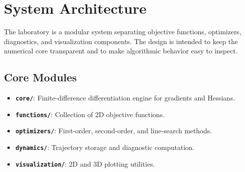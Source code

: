 \documentclass[12pt,a4paper]{report}
\begin{document}


\begin{abstract}
The Optimization Dynamics Laboratory is a Python framework for the empirical study of numerical optimization. It implements gradient-based, line-search, second-order, and constrained solvers from first principles, together with finite-difference derivatives and trajectory diagnostics. This report describes the system architecture, the numerical approximations used by the solvers, and the visualization layer used to inspect optimization dynamics.
\end{abstract}

\tableofcontents
\clearpage

\chapter{System Architecture}

The laboratory is a modular system separating objective functions, optimizers, diagnostics, and visualization components. The design is intended to keep the numerical core transparent and to make algorithmic behavior easy to inspect.

\section{Core Modules}

\begin{itemize}
    \item \textbf{\texttt{core/}}: Finite-difference differentiation engine for gradients and Hessians.
    \item \textbf{\texttt{functions/}}: Collection of 2D objective functions.
    \item \textbf{\texttt{optimizers/}}: First-order, second-order, and line-search methods.
    \item \textbf{\texttt{dynamics/}}: Trajectory storage and diagnostic computation.
    \item \textbf{\texttt{visualization/}}: 2D and 3D plotting utilities.
\end{itemize}
\end{document}
